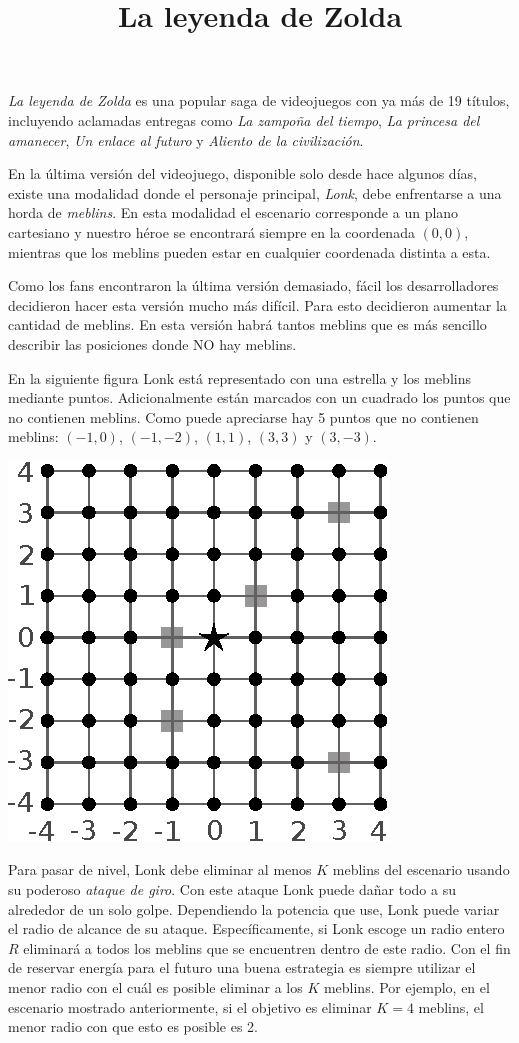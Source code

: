 \documentclass{oci}
\title{La leyenda de Zolda}
\begin{document}
\begin{problemDescription}
  \emph{La leyenda de Zolda} es una popular saga de videojuegos con ya más de 19
  títulos, incluyendo aclamadas entregas como \emph{La zampoña del tiempo},
  \emph{La princesa del amanecer}, \emph{Un enlace al futuro} y \emph{Aliento de
  la civilización}.

  En la última versión del videojuego, disponible solo desde hace algunos días,
  existe una modalidad donde el personaje principal, \emph{Lonk}, debe
  enfrentarse a una horda de \emph{meblins}.
  En esta modalidad el escenario corresponde a un plano cartesiano y nuestro
  héroe se encontrará siempre en la coordenada $(0,0)$, mientras que los meblins
  pueden estar en cualquier coordenada distinta a esta.

  Como los fans encontraron la última versión demasiado, fácil los
  desarrolladores decidieron hacer esta versión mucho más difícil.
  Para esto decidieron aumentar la cantidad de meblins.
  En esta versión habrá tantos meblins que es más sencillo describir las
  posiciones donde NO hay meblins.

  En la siguiente figura Lonk está representado con una estrella y los meblins
  mediante puntos.
  Adicionalmente están marcados con un cuadrado los puntos que no contienen meblins.
  Como puede apreciarse hay 5 puntos que no contienen meblins: $(-1,0)$, $(-1,-2)$,
  $(1,1)$, $(3,3)$ y $(3, -3)$.
  \begin{center}
  \includegraphics{zolda}
  \end{center}
  Para pasar de nivel, Lonk debe eliminar al menos $K$ meblins del escenario
  usando su poderoso \emph{ataque de giro}.
  Con este ataque Lonk puede dañar todo a su alrededor de un solo golpe.
  Dependiendo la potencia que use, Lonk puede variar el radio de alcance de su
  ataque.
  Específicamente, si Lonk escoge un radio entero $R$ eliminará a todos los
  meblins que se encuentren dentro de este radio.
  Con el fin de reservar energía para el futuro una buena estrategia es siempre
  utilizar el menor radio con el cuál es posible eliminar a los $K$ meblins.
  Por ejemplo, en el escenario mostrado anteriormente, si el objetivo es eliminar
  $K=4$ meblins, el menor radio con que esto es posible es 2.


\end{problemDescription}
\end{document}
